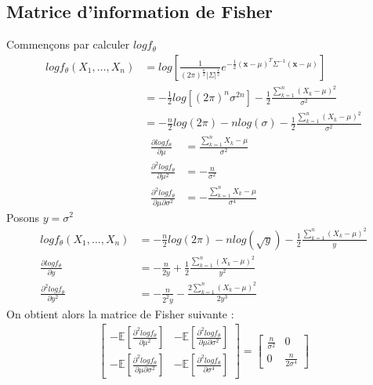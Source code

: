 \documentclass{report}
\begin{document}
		\subsection{Matrice d'information de Fisher}
			Commençons par calculer $log f_\theta$
			\begin{align*}
				log f_\theta(X_1, \ldots, X_n) &= log\left[ \frac{1}{(2\pi)^\frac{n}{2}|\Sigma|^\frac{1}{2}}e^{-\frac{1}{2}(\textbf{x}-\mu)^T\Sigma^{-1}(\textbf{x}-\mu)} \right]\\
				&= -\frac{1}{2}log\left[ (2\pi)^n \sigma^{2n} \right] -\frac{1}{2}\frac{\sum\limits_{k=1}^n (X_k - \mu)^2}{\sigma^2} \\
				&= -\frac{n}{2}log(2\pi)-n log(\sigma) -\frac{1}{2}\frac{\sum\limits_{k=1}^n (X_k - \mu)^2}{\sigma^2}
			\end{align*}
			\begin{align*}
				\frac{\partial log f_\theta}{\partial \mu} &= \frac{\sum\limits_{k=1}^n X_k - \mu}{\sigma^2}\\
				\frac{\partial^2 log f_\theta}{\partial \mu^2} &= -\frac{n}{\sigma^2}\\
				\frac{\partial^2 log f_\theta}{\partial \mu \partial \sigma^2} &= -\frac{\sum\limits_{k=1}^n X_k - \mu}{\sigma^4}
			\end{align*}
			Posons $y=\sigma^2$
			\begin{align*}
				log f_\theta(X_1, \ldots, X_n) &= -\frac{n}{2}log(2\pi)-n log(\sqrt{y}) -\frac{1}{2}\frac{\sum\limits_{k=1}^n (X_k - \mu)^2}{y}\\
				\frac{\partial log f_\theta}{\partial y} &= -\frac{n}{2y} + \frac{1}{2}\frac{\sum\limits_{k=1}^n (X_k - \mu)^2}{y^2}\\
				\frac{\partial^2 log f_\theta}{\partial y^2} &= -\frac{n}{2^2y} - \frac{2\sum\limits_{k=1}^n (X_k - \mu)^2}{2y^3}
			\end{align*}
			On obtient alors la matrice de Fisher suivante :
			\begin{align*}
				\left[\begin{array}{cc}
					-\mathbb{E}[\frac{\partial^2 log f_\theta}{\partial \mu^2}] & -\mathbb{E}[\frac{\partial^2 log f_\theta}{\partial \mu \partial \sigma^2}] \\
					-\mathbb{E}[\frac{\partial^2 log f_\theta}{\partial \mu \partial \sigma^2}] & -\mathbb{E}[\frac{\partial^2 log f_\theta}{\partial \sigma^4}]
				\end{array}\right]
				=
				\left[\begin{array}{cc}
					\frac{n}{\sigma^2} & 0 \\
					0 & \frac{n}{2\sigma^4}
				\end{array}\right]
			\end{align*}
\end{document}
